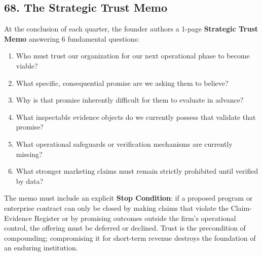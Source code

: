 \subsection*{68. The Strategic Trust Memo}

At the conclusion of each quarter, the founder authors a 1-page \textbf{Strategic Trust Memo} answering 6 fundamental questions:
\begin{enumerate}
\item Who must trust our organization for our next operational phase to become viable?
\item What specific, consequential promise are we asking them to believe?
\item Why is that promise inherently difficult for them to evaluate in advance?
\item What inspectable evidence objects do we currently possess that validate that promise?
\item What operational safeguards or verification mechanisms are currently missing?
\item What stronger marketing claims must remain strictly prohibited until verified by data?
\end{enumerate}

The memo must include an explicit \textbf{Stop Condition}: if a proposed program or enterprise contract can only be closed by making claims that violate the Claim-Evidence Register or by promising outcomes outside the firm's operational control, the offering must be deferred or declined. Trust is the precondition of compounding; compromising it for short-term revenue destroys the foundation of an enduring institution.
